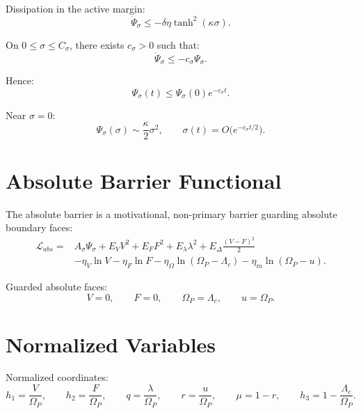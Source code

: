 \documentclass[11pt,a4paper]{article}
\newcommand{\Om}{\Omega_P}
\theoremstyle{remark}
\begin{document}
Dissipation in the active margin:
\begin{equation}
  \dot\Psi_\sigma\le -\delta\eta\tanh^2(\kappa\sigma).
\end{equation}

On $0\le\sigma\le C_\sigma$, there exists $c_\sigma>0$ such that:
\begin{equation}
  \dot\Psi_\sigma\le -c_\sigma\Psi_\sigma.
\end{equation}

Hence:
\begin{equation}
  \Psi_\sigma(t)\le \Psi_\sigma(0)e^{-c_\sigma t}.
\end{equation}

Near $\sigma=0$:
\begin{equation}
  \Psi_\sigma(\sigma)\sim \frac{\kappa}{2}\sigma^2,
  \qquad
  \sigma(t)=O\bigl(e^{-c_\sigma t/2}\bigr).
\end{equation}

\section{Absolute Barrier Functional}

The absolute barrier is a motivational, non-primary barrier guarding absolute boundary faces:
\begin{equation}
\begin{aligned}
  \mathcal L_{abs}={}&
  A_\sigma\Psi_\sigma+E_VV^2+E_FF^2+E_\lambda\lambda^2
  +E_\Delta\frac{(V-F)^2}{2} \\
  &-\eta_V\ln V-\eta_F\ln F
  -\eta_\Omega\ln(\Om-\Lambda_c)
  -\eta_m\ln(\Om-u).
\end{aligned}
\end{equation}

Guarded absolute faces:
\begin{equation}
  V=0,
  \qquad
  F=0,
  \qquad
  \Om=\Lambda_c,
  \qquad
  u=\Om.
\end{equation}

\section{Normalized Variables}

Normalized coordinates:
\begin{equation}
  h_1=\frac{V}{\Om},
  \qquad
  h_2=\frac{F}{\Om},
  \qquad
  q=\frac{\lambda}{\Om},
  \qquad
  r=\frac{u}{\Om},
  \qquad
  \mu=1-r,
  \qquad
  h_3=1-\frac{\Lambda_c}{\Om}.
\end{equation}
\end{document}
